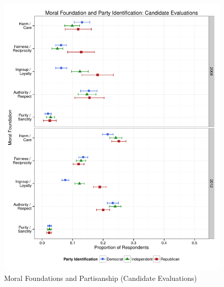 \documentclass[12pt]{article}
\begin{document}
\begin{figure}[ht]\centering
\includegraphics[scale=.4]{../calc/fig/a2_mft_pid_ca.pdf}
\caption{Moral Foundations and Partisanship (Candidate Evaluations)}\label{fig:a2_mft_pid_ca}
\end{figure}
\end{document}
